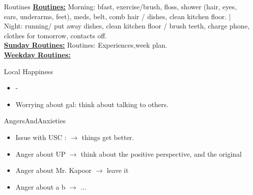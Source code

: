 \begin{columns}
  \begin{column}{0.20\linewidth}
    \begin{block}{Routines}
      { \tiny \underline{\bf Routines:} Morning: bfast, exercise/brush,
        floss, shower (hair, eyes, ears, underarms, feet), meds, belt,
        comb hair / dishes, clean kitchen floor. |  Night: running/ put
        away dishes, clean kitchen floor / brush teeth, charge phone,
        clothes for tomorrow, contacts off.}\\
      {\tiny \underline{\bf Sunday Routines:} Routines:
        Experiences,week plan.}\\ 
      {\tiny \underline{\bf Weekday Routines:}}\\
    \end{block} 
    \begin{block}{Local Happiness}
      \begin{itemize} 
        \tiny \item \tiny -
      \item \tiny Worrying about gal: think about talking to others.
      \end{itemize} 
    \end{block}
    \begin{block}{AngersAndAnxieties}
      \begin{itemize}
        \item \tiny Issue with USC : $\rightarrow$ things get better. 
        \tiny \item \tiny Anger about UP $\rightarrow$ think about the positive
        perspective, and the original
      \item \tiny Anger about Mr. Kapoor $\rightarrow$  leave it
      \item \tiny Anger about a b  $\rightarrow$ ...

\end{itemize}
\end{block}
\end{column}
\end{columns}
